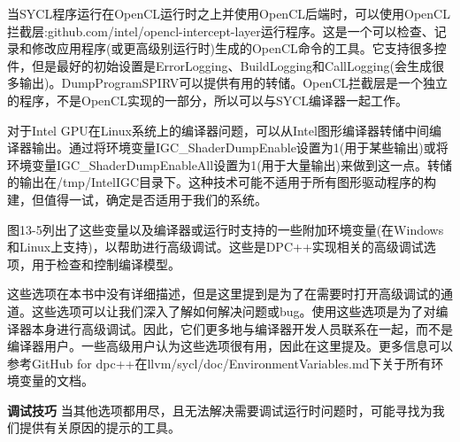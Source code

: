 当SYCL程序运行在OpenCL运行时之上并使用OpenCL后端时，可以使用OpenCL拦截层:github.com/intel/opencl-intercept-layer运行程序。这是一个可以检查、记录和修改应用程序(或更高级别运行时)生成的OpenCL命令的工具。它支持很多控件，但是最好的初始设置是ErrorLogging、BuildLogging和CallLogging(会生成很多输出)。DumpProgramSPIRV可以提供有用的转储。OpenCL拦截层是一个独立的程序，不是OpenCL实现的一部分，所以可以与SYCL编译器一起工作。\par

对于Intel GPU在Linux系统上的编译器问题，可以从Intel图形编译器转储中间编译器输出。通过将环境变量IGC\_ShaderDumpEnable设置为1(用于某些输出)或将环境变量IGC\_ShaderDumpEnableAll设置为1(用于大量输出)来做到这一点。转储的输出在/tmp/IntelIGC目录下。这种技术可能不适用于所有图形驱动程序的构建，但值得一试，确定是否适用于我们的系统。\par

图13-5列出了这些变量以及编译器或运行时支持的一些附加环境变量(在Windows和Linux上支持)，以帮助进行高级调试。这些是DPC++实现相关的高级调试选项，用于检查和控制编译模型。\par

这些选项在本书中没有详细描述，但是这里提到是为了在需要时打开高级调试的通道。这些选项可以让我们深入了解如何解决问题或bug。使用这些选项是为了对编译器本身进行高级调试。因此，它们更多地与编译器开发人员联系在一起，而不是编译器用户。一些高级用户认为这些选项很有用，因此在这里提及。更多信息可以参考GitHub for dpc++在llvm/sycl/doc/EnvironmentVariables.md下关于所有环境变量的文档。\par

\begin{tcolorbox}[colback=red!5!white,colframe=red!75!black]
\textbf{调试技巧} 当其他选项都用尽，且无法解决需要调试运行时问题时，可能寻找为我们提供有关原因的提示的工具。
\end{tcolorbox}

